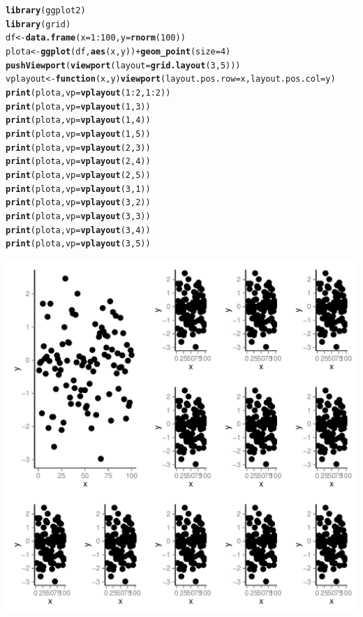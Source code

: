 \documentclass{article}\usepackage{graphicx, color}
\makeatletter
\def\maxwidth{ %
  \ifdim\Gin@nat@width>\linewidth
    \linewidth
  \else
    \Gin@nat@width
  \fi
}
\newcommand{\hlfunctioncall}[1]{\textcolor[rgb]{0.501960784313725,0,0.329411764705882}{\textbf{#1}}}%
\newenvironment{kframe}{%
 \def\at@end@of@kframe{}%
 \ifinner\ifhmode%
  \def\at@end@of@kframe{\end{minipage}}%
  \begin{minipage}{\columnwidth}%
 \fi\fi%
 \def\FrameCommand##1{\hskip\@totalleftmargin \hskip-\fboxsep
 \colorbox{shadecolor}{##1}\hskip-\fboxsep
     \hskip-\linewidth \hskip-\@totalleftmargin \hskip\columnwidth}%
 \MakeFramed {\advance\hsize-\width
   \@totalleftmargin\z@ \linewidth\hsize
   \@setminipage}}%
 {\par\unskip\endMakeFramed%
 \at@end@of@kframe}
\newenvironment{knitrout}{}{} %
\makeatother
\begin{document}
\begin{knitrout}
\color{fgcolor}\begin{kframe}
\begin{alltt}
\hlfunctioncall{library}(ggplot2)
\hlfunctioncall{library}(grid)
df <- \hlfunctioncall{data.frame}(x = 1:100, y = \hlfunctioncall{rnorm}(100))
plota <- \hlfunctioncall{ggplot}(df, \hlfunctioncall{aes}(x, y)) + \hlfunctioncall{geom_point}(size = 4)
\hlfunctioncall{pushViewport}(\hlfunctioncall{viewport}(layout = \hlfunctioncall{grid.layout}(3, 5)))
vplayout <- \hlfunctioncall{function}(x, y) \hlfunctioncall{viewport}(layout.pos.row = x, layout.pos.col = y)
\hlfunctioncall{print}(plota, vp = \hlfunctioncall{vplayout}(1:2, 1:2))
\hlfunctioncall{print}(plota, vp = \hlfunctioncall{vplayout}(1, 3))
\hlfunctioncall{print}(plota, vp = \hlfunctioncall{vplayout}(1, 4))
\hlfunctioncall{print}(plota, vp = \hlfunctioncall{vplayout}(1, 5))
\hlfunctioncall{print}(plota, vp = \hlfunctioncall{vplayout}(2, 3))
\hlfunctioncall{print}(plota, vp = \hlfunctioncall{vplayout}(2, 4))
\hlfunctioncall{print}(plota, vp = \hlfunctioncall{vplayout}(2, 5))
\hlfunctioncall{print}(plota, vp = \hlfunctioncall{vplayout}(3, 1))
\hlfunctioncall{print}(plota, vp = \hlfunctioncall{vplayout}(3, 2))
\hlfunctioncall{print}(plota, vp = \hlfunctioncall{vplayout}(3, 3))
\hlfunctioncall{print}(plota, vp = \hlfunctioncall{vplayout}(3, 4))
\hlfunctioncall{print}(plota, vp = \hlfunctioncall{vplayout}(3, 5))
\end{alltt}
\end{kframe}\includegraphics[width=\maxwidth,angle=90]{figure/unnamed-chunk-1} 
\end{knitrout}
\end{document}
